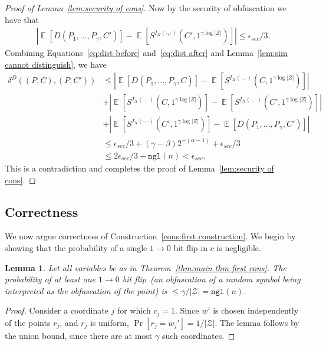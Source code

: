 \documentclass[11pt]{article}
\newtheorem{lemma}[theorem]{Lemma}
\newcommand{\thref}[1]{\mbox{Theorem~\ref{#1}}}
\newcommand{\lemref}[1]{\mbox{Lemma~\ref{#1}}}
\newcommand{\consref}[1]{\mbox{Construction~\ref{#1}}}
\DeclareMathOperator*{\expe}{\mathbb{E}}
\newcommand{\dis}{\ensuremath{\mathsf{dis}}}
\newcommand{\ngl}{\ensuremath{\mathtt{ngl}}\xspace}
\begin{document}
\begin{proof}[Proof of \lemref{lem:security of cons}]
\noindent Now by the security of obfuscation we have that
\begin{align}
\label{eq:dist after}
|\expe [D(P_1,..., P_\gamma, C') ]- \expe [S^{I_X(\cdot, \cdot)}(C', 1^{\gamma \log |Z|})] |\leq \epsilon_{sec}/3.
\end{align}
Combining Equations~\ref{eq:dist before} and~\ref{eq:dist after} and \lemref{lem:sim cannot distinguish}, we have
\begin{align*}
\delta^{D}(( P, C), (P, C'))&\leq |\expe [D(P_1,..., P_\gamma, C)] - \expe [S^{I_X(\cdot, \cdot)}(C, 1^{\gamma \log |Z|})]| \\
&+|\expe[S^{I_X(\cdot, \cdot)}(C, 1^{\gamma \log |Z|})] - \expe[S^{I_X(\cdot, \cdot)}(C', 1^{\gamma \log |Z|})] |\\
&+|\expe [S^{I_X(\cdot, \cdot)}(C', 1^{\gamma \log |Z|})] - \expe [D(P_1,..., P_\gamma, C') ]|\\
&\leq \epsilon_{sec}/3+ (\gamma-\beta)2^{-(\alpha-1)}+\epsilon_{sec}/3 \\
&\leq 2\epsilon_{sec}/3 + \ngl(n) < \epsilon_{sec}.
\end{align*}
This is a contradiction and completes the proof of \lemref{lem:security of cons}.
\end{proof}

\subsection{Correctness}
We now argue correctness of \consref{cons:first construction}.
We begin by showing that the probability of a single $1\rightarrow 0$ bit flip in $c$ is negligible.
\begin{lemma}
\label{lem:no 1 to 0 flips}
Let all variables be as in \thref{thm:main thm first cons}.
The probability of at least one $1\rightarrow 0$ bit flip~(an obfuscation of a random symbol being interpreted as the obfuscation of the point) is $ \le \gamma/|\mathcal{Z}| = \ngl(n)$.
\end{lemma}
\begin{proof}
Consider a coordinate $j$ for which $c_j=1$. Since $w'$ is chosen independently of the points $r_j$, and $r_j$ is uniform, $\Pr[r_j =w_j']  = 1/|\mathcal{Z}|$. The lemma follows by the union bound, since there are at most $\gamma$ such coordinates.
\end{proof}
\end{document}
